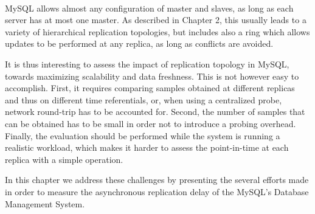 \paragraph{}



MySQL allows almost any configuration of master and slaves, as long as each server has at most one master. As described in Chapter 2, this usually leads to a variety of  hierarchical replication topologies, but includes also a ring which allows updates to be performed at any replica, as long as conflicts are avoided.

It is thus interesting to assess the impact of replication topology in MySQL, towards maximizing scalability and data freshness. This is not however easy to accomplish. First, it requires comparing samples obtained at different replicas and thus on different time referentials, or, when using a centralized probe, network round-trip has to be accounted for. Second, the number of samples that can be obtained has to be small in order not to introduce a probing overhead. Finally, the evaluation should be performed while the system is running a realistic workload, which makes it harder to assess the point-in-time at each replica with a simple operation.

In this chapter we address these challenges by presenting the several efforts made in order to measure the asynchronous replication delay of the MySQL's Database Management System.


